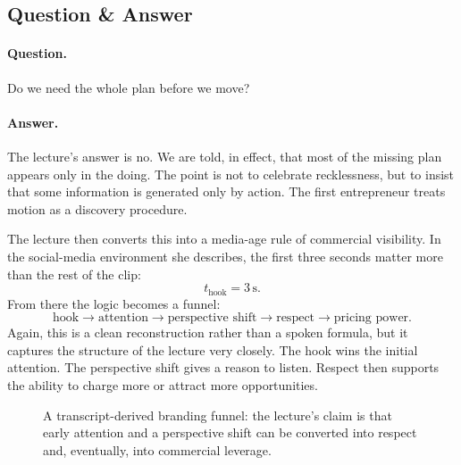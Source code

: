 \subsection{Question \& Answer}

\paragraph{Question.} Do we need the whole plan before we move?

\paragraph{Answer.} The lecture's answer is no. We are told, in effect, that most of the missing plan appears only in the doing. The point is not to celebrate recklessness, but to insist that some information is generated only by action. The first entrepreneur treats motion as a discovery procedure.

The lecture then converts this into a media-age rule of commercial visibility. In the social-media environment she describes, the first three seconds matter more than the rest of the clip:
\begin{equation}
t_{\mathrm{hook}} = 3\,\mathrm{s}.
\end{equation}
From there the logic becomes a funnel:
\begin{equation}
\text{hook} \to \text{attention} \to \text{perspective shift} \to \text{respect} \to \text{pricing power}.
\end{equation}
Again, this is a clean reconstruction rather than a spoken formula, but it captures the structure of the lecture very closely. The hook wins the initial attention. The perspective shift gives a reason to listen. Respect then supports the ability to charge more or attract more opportunities.

\begin{figure}[h]
\centering
{}
\caption{A transcript-derived branding funnel: the lecture's claim is that early attention and a perspective shift can be converted into respect and, eventually, into commercial leverage.}
\end{figure}

